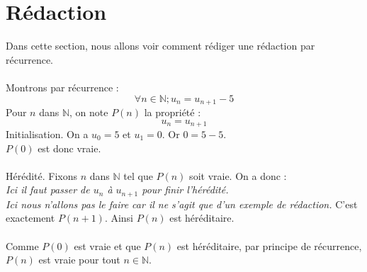 \documentclass{article}
\begin{document}
	\section{Rédaction}

	Dans cette section, nous allons voir comment rédiger une rédaction par récurrence. \\
	\\
	Montrons par récurrence :
	\[ \forall n \in \mathbb{N} ; u_n = u_{n+1} - 5 \]
	Pour $n$ dans $\mathbb{N}$, on note $P(n)$ la propriété :
	\[ u_n = u_{n+1} \]
	Initialisation. On a $u_0 = 5$ et $u_1 = 0$. Or $0 = 5-5$. \\
	$P(0)$ est donc vraie. \\
	\\
	Hérédité. Fixons $n$ dans $\mathbb{N}$ tel que $P(n)$ soit vraie. On a donc : \\
	\textit{
		Ici il faut passer de $u_n$ à $u_{n+1}$ pour finir l'hérédité. \\
		Ici nous n'allons pas le faire car il ne s'agit que d'un exemple de rédaction.
	}
	C'est exactement $P(n+1)$. Ainsi $P(n)$ est héréditaire. \\
	\\
	Comme $P(0)$ est vraie et que $P(n)$ est héréditaire, par principe de récurrence, $P(n)$ est vraie pour tout $n \in \mathbb{N}$.
\end{document}
